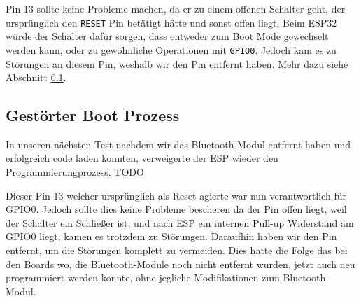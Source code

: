 Pin 13 sollte keine Probleme machen, da er zu einem offenen Schalter geht,
der ursprünglich den \texttt{RESET} Pin betätigt hätte und sonst offen liegt. 
Beim ESP32 würde der Schalter dafür sorgen, 
dass entweder zum Boot Mode gewechselt werden kann, 
oder zu gewöhnliche Operationen mit \texttt{GPIO0}. 
Jedoch kam es zu Störungen an diesem Pin, 
weshalb wir den Pin entfernt haben. 
Mehr dazu siehe Abschnitt \ref{subsec:gestoert_boot}.


\subsection{Gestörter Boot Prozess}
\label{subsec:gestoert_boot}
In unseren nächsten Test nachdem wir das Bluetooth-Modul entfernt haben 
und erfolgreich code laden konnten, verweigerte der ESP wieder den Programmierungprozess.
TODO

Dieser Pin 13 welcher ursprünglich als Reset agierte war nun verantwortlich für GPIO0. 
Jedoch sollte dies keine Probleme bescheren da der Pin offen liegt, weil der Schalter ein Schließer ist,
und nach ESP ein internen Pull-up Widerstand am GPIO0 liegt, kamen es trotzdem zu Störungen.
Daraufhin haben wir den Pin entfernt, um die Störungen komplett zu vermeiden. 
Dies hatte die Folge das bei den Boards wo, die Bluetooth-Module noch nicht entfernt wurden,
jetzt auch neu programmiert werden konnte, ohne jegliche Modifikationen zum Bluetooth-Modul.
